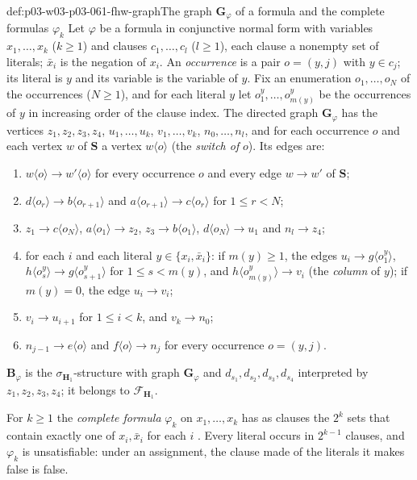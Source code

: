 \begin{hbdefinition}{def:p03-w03-p03-061-fhw-graph}{The graph \(\mathbf G_\varphi\) of a formula and the complete formulas \(\varphi_k\)}
Let \(\varphi\) be a formula in conjunctive normal form with variables
\(x_1,\ldots,x_k\) (\(k\ge1\)) and clauses \(c_1,\ldots,c_l\) (\(l\ge1\)),
each clause a nonempty set of literals; \(\bar x_i\) is the negation of
\(x_i\). An \emph{occurrence} is a pair \(o=(y,j)\) with \(y\in c_j\); its
literal is \(y\) and its variable is the variable of \(y\). Fix an
enumeration \(o_1,\ldots,o_N\) of the occurrences (\(N\ge1\)), and for each
literal \(y\) let \(o^y_1,\ldots,o^y_{m(y)}\) be the occurrences of \(y\)
in increasing order of the clause index. The directed graph
\(\mathbf G_\varphi\) has the vertices \(z_1,z_2,z_3,z_4\),
\(u_1,\ldots,u_k\), \(v_1,\ldots,v_k\), \(n_0,\ldots,n_l\), and for each
occurrence \(o\) and each vertex \(w\) of \(\mathbf S\) a vertex
\(w\langle o\rangle\) (the \emph{switch of} \(o\)). Its edges are:
\begin{enumerate}
\item \(w\langle o\rangle\to w'\langle o\rangle\) for every occurrence
      \(o\) and every edge \(w\to w'\) of \(\mathbf S\);
\item \(d\langle o_r\rangle\to b\langle o_{r+1}\rangle\) and
      \(a\langle o_{r+1}\rangle\to c\langle o_r\rangle\) for
      \(1\le r<N\);
\item \(z_1\to c\langle o_N\rangle\), \(a\langle o_1\rangle\to z_2\),
      \(z_3\to b\langle o_1\rangle\), \(d\langle o_N\rangle\to u_1\) and
      \(n_l\to z_4\);
\item for each \(i\) and each literal \(y\in\{x_i,\bar x_i\}\): if
      \(m(y)\ge1\), the edges \(u_i\to g\langle o^y_1\rangle\),
      \(h\langle o^y_s\rangle\to g\langle o^y_{s+1}\rangle\) for
      \(1\le s<m(y)\), and \(h\langle o^y_{m(y)}\rangle\to v_i\) (the
      \emph{column} of \(y\)); if \(m(y)=0\), the edge \(u_i\to v_i\);
\item \(v_i\to u_{i+1}\) for \(1\le i<k\), and \(v_k\to n_0\);
\item \(n_{j-1}\to e\langle o\rangle\) and \(f\langle o\rangle\to n_j\) for
      every occurrence \(o=(y,j)\).
\end{enumerate}
\(\mathbf B_\varphi\) is the \(\sigma_{\mathbf H_1}\)-structure with graph
\(\mathbf G_\varphi\) and \(d_{s_1},d_{s_2},d_{s_3},d_{s_4}\) interpreted by
\(z_1,z_2,z_3,z_4\); it belongs to \(\mathcal F_{\mathbf H_1}\).

For \(k\ge1\) the \emph{complete formula} \(\varphi_k\) on
\(x_1,\ldots,x_k\) has as clauses the \(2^k\) sets that contain exactly one of
\(x_i,\bar x_i\) for each \(i\) \cite[p.~34]{KolaitisVardi1995DatalogManuscript}.
Every literal occurs in \(2^{k-1}\) clauses, and \(\varphi_k\) is
unsatisfiable: under an assignment, the clause made of the literals it makes
false is false.
\end{hbdefinition}


